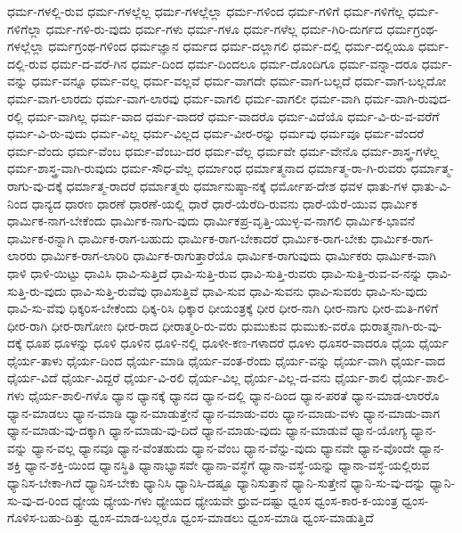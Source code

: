 {ಧರ್ಮ-ಗಳಲ್ಲಿ-ರುವ
ಧರ್ಮ-ಗಳಲ್ಲೆಲ್ಲ
ಧರ್ಮ-ಗಳಲ್ಲೆಲ್ಲಾ
ಧರ್ಮ-ಗಳಿಂದ
ಧರ್ಮ-ಗಳಿಗೆ
ಧರ್ಮ-ಗಳಿಗೆಲ್ಲ
ಧರ್ಮ-ಗಳಿಗೆಲ್ಲಾ
ಧರ್ಮ-ಗಳಿ-ರು-ವುದು
ಧರ್ಮ-ಗಳು
ಧರ್ಮ-ಗಳೂ
ಧರ್ಮ-ಗಳೆಲ್ಲ
ಧರ್ಮ-ಗಿರಿ-ದುರ್ಗದ
ಧರ್ಮಗ್ರಂಥ-ಗಳಲ್ಲೆಲ್ಲಾ
ಧರ್ಮಗ್ರಂಥ-ಗಳಿಂದ
ಧರ್ಮಜ್ಞಾನ
ಧರ್ಮದ
ಧರ್ಮ-ದಲ್ಲಾಗಲಿ
ಧರ್ಮ-ದಲ್ಲಿ
ಧರ್ಮ-ದಲ್ಲಿಯೂ
ಧರ್ಮ-ದಲ್ಲಿ-ರುವ
ಧರ್ಮ-ದ-ವರೆ-ಗಿನ
ಧರ್ಮ-ದಿಂದ
ಧರ್ಮ-ದಿಂದಲೂ
ಧರ್ಮ-ದೊಂದಿಗೂ
ಧರ್ಮ-ವನ್ನಾ-ದರೂ
ಧರ್ಮ-ವನ್ನು
ಧರ್ಮ-ವನ್ನೂ
ಧರ್ಮ-ವಲ್ಲ
ಧರ್ಮ-ವಲ್ಲವೆ
ಧರ್ಮ-ವಾಗದೇ
ಧರ್ಮ-ವಾಗ-ಬಲ್ಲದೆ
ಧರ್ಮ-ವಾಗ-ಬಲ್ಲದೋ
ಧರ್ಮ-ವಾಗ-ಲಾರದು
ಧರ್ಮ-ವಾಗ-ಲಾರವು
ಧರ್ಮ-ವಾಗಲಿ
ಧರ್ಮ-ವಾಗಲೀ
ಧರ್ಮ-ವಾಗಿ
ಧರ್ಮ-ವಾಗಿ-ರುವುದ-ರಲ್ಲಿ
ಧರ್ಮ-ವಾಗಿಲ್ಲ
ಧರ್ಮ-ವಾದ
ಧರ್ಮ-ವಾದರೆ
ಧರ್ಮ-ವಾದರೊ
ಧರ್ಮ-ವಿದೆಯೊ
ಧರ್ಮ-ವಿ-ರು-ವ-ವರೆಗೆ
ಧರ್ಮ-ವಿ-ರು-ವುದು
ಧರ್ಮ-ವಿಲ್ಲ
ಧರ್ಮ-ವಿಲ್ಲದ
ಧರ್ಮ-ವೀರ-ರನ್ನು
ಧರ್ಮವು
ಧರ್ಮವೂ
ಧರ್ಮ-ವೆಂದರೆ
ಧರ್ಮ-ವೆಂದು
ಧರ್ಮ-ವೆಂಬ
ಧರ್ಮ-ವೆಂಬು-ದರ
ಧರ್ಮ-ವೆಲ್ಲ
ಧರ್ಮವೇ
ಧರ್ಮ-ವೇನೊ
ಧರ್ಮ-ಶಾಸ್ತ್ರ-ಗಳೆಲ್ಲ
ಧರ್ಮ-ಶಾಸ್ತ್ರ-ವಾಗಿ-ರುವುದು
ಧರ್ಮ-ಸೌಧ-ವೆಲ್ಲ
ಧರ್ಮಾಂಧ
ಧರ್ಮಾತ್ಮನಾದ
ಧರ್ಮಾತ್ಮ-ರಾ-ಗಿ-ರುವರು
ಧರ್ಮಾತ್ಮ-ರಾಗು-ವು-ದಕ್ಕೆ
ಧರ್ಮಾತ್ಮ-ರಾದರೆ
ಧರ್ಮಾತ್ಮರು
ಧರ್ಮಾನುಷ್ಠಾ-ನಕ್ಕೆ
ಧರ್ಮೋಪ-ದೇಶ
ಧವಳ
ಧಾತು-ಗಳ
ಧಾತು-ವಿ-ನಿಂದ
ಧಾನ್ಯದ
ಧಾರಣ
ಧಾರಣೆ
ಧಾರಣೆ-ಯಲ್ಲಿ
ಧಾರೆ
ಧಾರೆ-ಯೆರೆದಿ-ರುವನು
ಧಾರೆ-ಯೆರೆ-ಯುವ
ಧಾರ್ಮಿಕ
ಧಾರ್ಮಿಕ-ನಾಗ-ಬೇಕೆಂದು
ಧಾರ್ಮಿಕ-ನಾಗು-ವುದು
ಧಾರ್ಮಿಕಪ್ರ-ವೃತ್ತಿ-ಯುಳ್ಳ-ವ-ನಾಗಲಿ
ಧಾರ್ಮಿಕ-ಭಾವನೆ
ಧಾರ್ಮಿಕ-ರನ್ನಾಗಿ
ಧಾರ್ಮಿಕ-ರಾಗ-ಬಹುದು
ಧಾರ್ಮಿಕ-ರಾಗ-ಬೇಕಾದರೆ
ಧಾರ್ಮಿಕ-ರಾಗ-ಬೇಕು
ಧಾರ್ಮಿಕ-ರಾಗ-ಲಾರರು
ಧಾರ್ಮಿಕ-ರಾಗ-ಲಾರಿರಿ
ಧಾರ್ಮಿಕ-ರಾಗುತ್ತಾರೆಯೊ
ಧಾರ್ಮಿಕ-ರಾಗುವುದು
ಧಾರ್ಮಿಕರು
ಧಾರ್ಮಿಕ-ವಾಗಿ
ಧಾಳಿ
ಧಾಳಿ-ಯಿಟ್ಟು
ಧಾವಿಸಿ
ಧಾವಿ-ಸುತ್ತಿದೆ
ಧಾವಿ-ಸುತ್ತಿ-ರುವ
ಧಾವಿ-ಸುತ್ತಿ-ರುವರು
ಧಾವಿ-ಸುತ್ತಿ-ರುವ-ವ-ನನ್ನು
ಧಾವಿ-ಸುತ್ತಿ-ರು-ವುದು
ಧಾವಿ-ಸುತ್ತಿ-ರುವೆವು
ಧಾವಿಸುತ್ತಿವೆ
ಧಾವಿ-ಸುವ
ಧಾವಿ-ಸುವನು
ಧಾವಿ-ಸುವರು
ಧಾವಿ-ಸು-ವುದು
ಧಾವಿ-ಸು-ವೆವು
ಧಿಕ್ಕರಿಸ-ಬೇಕೆಂದು
ಧಿಕ್ಕ-ರಿಸಿ
ಧಿಕ್ಕಾರ
ಧೀಯಂತ್ರಕ್ಕೆ
ಧೀರ
ಧೀರ-ನಾಗಿ
ಧೀರ-ನಾಗು
ಧೀರ-ಮತಿ-ಗಳಿಗೆ
ಧೀರ-ರಾಗಿ
ಧೀರ-ರಾಗೋಣ
ಧೀರ-ರಾದ
ಧೀರಾತ್ಮರಿ-ರು-ವರು
ಧುಮುಕುವ
ಧುಮುಕು-ವರೊ
ಧುರಾತ್ಮನಾಗಿ-ರು-ವು-ದಕ್ಕೆ
ಧೂಪ
ಧೂಳನ್ನು
ಧೂಳಿ
ಧೂಳಿನ
ಧೂಳಿ-ನಲ್ಲಿ
ಧೂಳೀ-ಕಣ-ಗಳಾದರೆ
ಧೂಳು
ಧೂಸರ-ವಾದರೂ
ಧೈಯ
ಧೈರ್ಯ
ಧೈರ್ಯ-ತಾಳು
ಧೈರ್ಯ-ದಿಂದ
ಧೈರ್ಯ-ಮಾಡಿ
ಧೈರ್ಯ-ವಂತ-ರೆಂದು
ಧೈರ್ಯ-ವನ್ನು
ಧೈರ್ಯ-ವಾಗಿ
ಧೈರ್ಯ-ವಾದ
ಧೈರ್ಯ-ವಿದೆ
ಧೈರ್ಯ-ವಿದ್ದರೆ
ಧೈರ್ಯ-ವಿ-ರಲಿ
ಧೈರ್ಯ-ವಿಲ್ಲ
ಧೈರ್ಯ-ವಿಲ್ಲ-ದ-ವನು
ಧೈರ್ಯ-ಶಾಲಿ
ಧೈರ್ಯ-ಶಾಲಿ-ಗಳು
ಧೈರ್ಯ-ಶಾಲಿ-ಗಳೊ
ಧ್ಯಾನ
ಧ್ಯಾನಕ್ಕೆ
ಧ್ಯಾನದ
ಧ್ಯಾನ-ದಲ್ಲಿ
ಧ್ಯಾನ-ದಿಂದ
ಧ್ಯಾನ-ಪರತೆ
ಧ್ಯಾನ-ಮಾಡ-ಲಾರರೊ
ಧ್ಯಾನ-ಮಾಡಲು
ಧ್ಯಾನ-ಮಾಡಿ
ಧ್ಯಾನ-ಮಾಡುತ್ತೇನೆ
ಧ್ಯಾನ-ಮಾಡು-ವರು
ಧ್ಯಾನ-ಮಾಡು-ವಳು
ಧ್ಯಾನ-ಮಾಡು-ವಾಗ
ಧ್ಯಾನ-ಮಾಡು-ವು-ದಕ್ಕಾಗಿ
ಧ್ಯಾನ-ಮಾಡು-ವು-ದಿದೆ
ಧ್ಯಾನ-ಮಾಡು-ವುದು
ಧ್ಯಾನ-ಮಾಡುವೆ
ಧ್ಯಾನ-ಯೋಗ್ಯ
ಧ್ಯಾನ-ವನ್ನು
ಧ್ಯಾನ-ವಲ್ಲ
ಧ್ಯಾನವೂ
ಧ್ಯಾನ-ವೆಂತಹುದು
ಧ್ಯಾನ-ವೆಂಬ
ಧ್ಯಾನ-ವೆನ್ನು-ವುದು
ಧ್ಯಾನವೇ
ಧ್ಯಾನ-ವೊಂದೇ
ಧ್ಯಾನ-ಶಕ್ತಿ
ಧ್ಯಾನ-ಶಕ್ತಿ-ಯಿಂದ
ಧ್ಯಾನಸ್ಥಿತಿ
ಧ್ಯಾನಾಭ್ಯಾಸವೇ
ಧ್ಯಾನಾ-ವಸ್ಥೆಗೆ
ಧ್ಯಾನಾ-ವಸ್ಥೆ-ಯನ್ನು
ಧ್ಯಾನಾ-ವಸ್ಥೆ-ಯಲ್ಲಿರುವ
ಧ್ಯಾನಿಸ-ಬೇಕಾ-ಗಿದೆ
ಧ್ಯಾನಿಸ-ಬೇಕು
ಧ್ಯಾನಿಸಿ
ಧ್ಯಾನಿಸಿ-ದಷ್ಟೂ
ಧ್ಯಾನಿಸುತ್ತಾನೆ
ಧ್ಯಾನಿ-ಸುತ್ತೇನೆ
ಧ್ಯಾನಿ-ಸು-ವು-ದನ್ನು
ಧ್ಯಾನಿ-ಸು-ವು-ದ-ರಿಂದ
ಧ್ಯೇಯ
ಧ್ಯೇಯ-ಗಳು
ಧ್ಯೇಯದ
ಧ್ಯೇಯವೇ
ಧ್ರುವ-ದಷ್ಟು
ಧ್ವಂಸ
ಧ್ವಂಸ-ಕಾರ-ಕ-ಯಂತ್ರ
ಧ್ವಂಸ-ಗೊಳಿಸ-ಬಹು-ದಿತ್ತು
ಧ್ವಂಸ-ಮಾಡ-ಬಲ್ಲರೊ
ಧ್ವಂಸ-ಮಾಡಲು
ಧ್ವಂಸ-ಮಾಡಿ
ಧ್ವಂಸ-ಮಾಡುತ್ತಿದೆ
}
